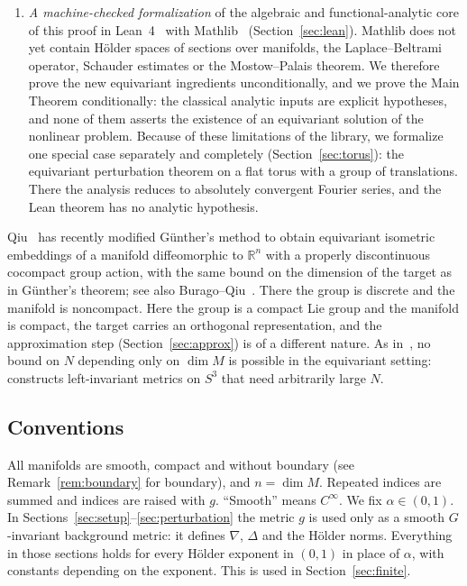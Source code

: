 \documentclass[11pt]{amsart}
\theoremstyle{definition}
\newcommand{\R}{\mathbb{R}}
\begin{document}
\begin{enumerate}[label=(\arabic*)]
\item \emph{A machine-checked formalization} of the algebraic and functional-analytic core of
this proof in Lean~4~\cite{Lean4} with Mathlib~\cite{Mathlib20} (Section~\ref{sec:lean}).
Mathlib does not yet contain H\"older spaces of sections over manifolds, the Laplace--Beltrami
operator, Schauder estimates or the Mostow--Palais theorem. We therefore prove the new
equivariant ingredients unconditionally, and we prove the Main Theorem conditionally: the
classical analytic inputs are explicit hypotheses, and none of them asserts the existence of an
equivariant solution of the nonlinear problem. Because of these limitations of the library, we
formalize one special case separately and completely (Section~\ref{sec:torus}): the equivariant
perturbation theorem on a flat torus with a group of translations. There the analysis reduces to
absolutely convergent Fourier series, and the Lean theorem has no analytic hypothesis.
\end{enumerate}

Qiu~\cite{Qiu25} has recently modified G\"unther's method to obtain equivariant isometric
embeddings of a manifold diffeomorphic to $\R^n$ with a properly discontinuous cocompact group
action, with the same bound on the dimension of the target as in G\"unther's theorem; see also
Burago--Qiu~\cite{BuragoQiu25}. There the group is discrete and the manifold is noncompact. Here
the group is a compact Lie group and the manifold is compact, the target carries an orthogonal
representation, and the approximation step (Section~\ref{sec:approx}) is of a different nature. As in~\cite{MS80}, no bound on $N$ depending only on $\dim M$ is
possible in the equivariant setting: \cite[\S6]{MS80} constructs left-invariant metrics on $S^3$
that need arbitrarily large $N$.

\subsection*{Conventions}
All manifolds are smooth, compact and without boundary (see Remark~\ref{rem:boundary} for
boundary), and $n=\dim M$. Repeated indices are summed and indices are raised with $g$. ``Smooth''
means $C^\infty$. We fix $\alpha\in(0,1)$. In Sections~\ref{sec:setup}--\ref{sec:perturbation}
the metric $g$ is used only as a smooth $G$-invariant background metric: it defines $\nabla$,
$\Delta$ and the H\"older norms. Everything in those sections holds for every H\"older exponent
in $(0,1)$ in place of $\alpha$, with constants depending on the exponent. This is used in
Section~\ref{sec:finite}.
\end{document}
